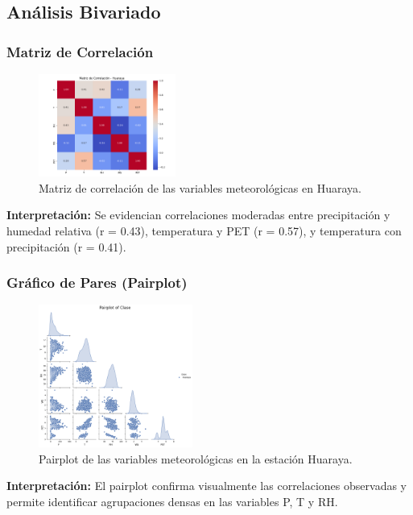 \subsection{Análisis Bivariado}

\subsubsection*{Matriz de Correlación}
\begin{figure}[H]
\centering
\includegraphics[width=0.4\textwidth]{resultados/por_estacion_meteorologica/Huaraya/matriz_correlacion.png}
\caption{Matriz de correlación de las variables meteorológicas en Huaraya.}
\label{fig:huaraya_corr}
\end{figure}
\textbf{Interpretación:} Se evidencian correlaciones moderadas entre precipitación y humedad relativa (r = 0.43), temperatura y PET (r = 0.57), y temperatura con precipitación (r = 0.41).

\subsubsection*{Gráfico de Pares (Pairplot)}
\begin{figure}[H]
\centering
\includegraphics[width=0.45\textwidth]{resultados/por_estacion_meteorologica/Huaraya/pairplot.png}
\caption{Pairplot de las variables meteorológicas en la estación Huaraya.}
\label{fig:huaraya_pairplot}
\end{figure}
\textbf{Interpretación:} El pairplot confirma visualmente las correlaciones observadas y permite identificar agrupaciones densas en las variables P, T y RH.



